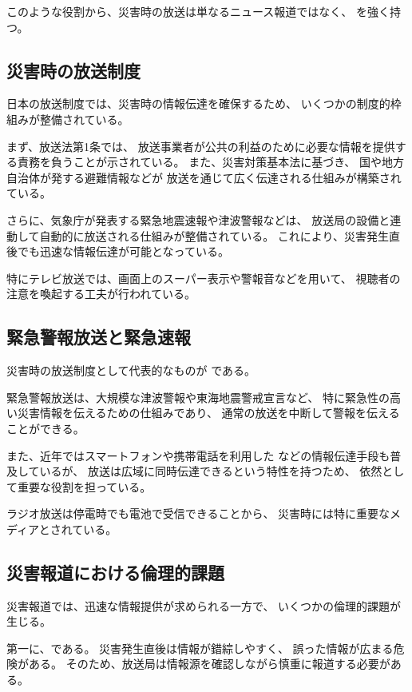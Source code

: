 このような役割から、災害時の放送は単なるニュース報道ではなく、
を強く持つ。

\subsection{災害時の放送制度}

日本の放送制度では、災害時の情報伝達を確保するため、
いくつかの制度的枠組みが整備されている。

まず、放送法第1条では、
放送事業者が公共の利益のために必要な情報を提供する責務を負うことが示されている。
また、災害対策基本法に基づき、
国や地方自治体が発する避難情報などが
放送を通じて広く伝達される仕組みが構築されている。

さらに、気象庁が発表する緊急地震速報や津波警報などは、
放送局の設備と連動して自動的に放送される仕組みが整備されている。
これにより、災害発生直後でも迅速な情報伝達が可能となっている。

特にテレビ放送では、画面上のスーパー表示や警報音などを用いて、
視聴者の注意を喚起する工夫が行われている。

\subsection{緊急警報放送と緊急速報}

災害時の放送制度として代表的なものが
である。

緊急警報放送は、大規模な津波警報や東海地震警戒宣言など、
特に緊急性の高い災害情報を伝えるための仕組みであり、
通常の放送を中断して警報を伝えることができる。

また、近年ではスマートフォンや携帯電話を利用した
などの情報伝達手段も普及しているが、
放送は広域に同時伝達できるという特性を持つため、
依然として重要な役割を担っている。

ラジオ放送は停電時でも電池で受信できることから、
災害時には特に重要なメディアとされている。

\subsection{災害報道における倫理的課題}

災害報道では、迅速な情報提供が求められる一方で、
いくつかの倫理的課題が生じる。

第一に、である。
災害発生直後は情報が錯綜しやすく、
誤った情報が広まる危険がある。
そのため、放送局は情報源を確認しながら慎重に報道する必要がある。

